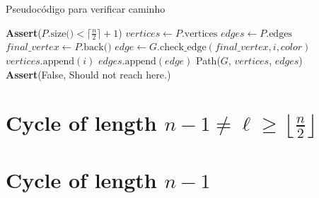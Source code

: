 \begin{algorithm}
    \caption{Pseudocódigo para verificar caminho}
    \begin{algorithmic}[1]
        \State \textbf{Assert}($P.\text{size()} < \lceil \frac{n}{2} \rceil + 1$)
        \State $vertices \gets P.\text{vertices}$
        \State $edges \gets P.\text{edges}$
        \State $final\_vertex \gets P.\text{back()}$
                        \State $edge \gets G.\text{check\_edge}(final\_vertex, i, color)$
                            \State $vertices.\text{append}(i)$
                            \State $edges.\text{append}(edge)$
                            \State \Return Path($G$, $vertices$, $edges$)
                        \EndIf
                    \EndIf
                \EndFor
            \EndIf
        \EndFor
        \State \textbf{Assert}(False, Should not reach here.)
    \EndFunction
    \end{algorithmic}
\end{algorithm}


\section{Cycle of length $n - 1 \neq \ell \geq \left \lfloor \frac{n}{2} \right \rfloor$}

\section{Cycle of length $n - 1$}


